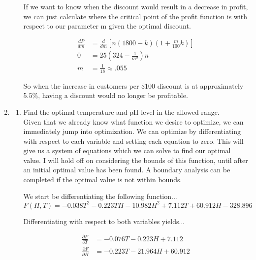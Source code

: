 \documentclass[11pt]{article}
\begin{document}
\begin{enumerate}
\begin{enumerate}
    If we want to know when the discount would result in a decrease in profit, we
    can just calculate where the critical point of the profit function is with
    respect to our parameter m given the optimal discount.
    
    \begin{align*}
        \frac{dP}{dm} &= \frac{d}{dm} \left[n(1800 - k)(1+ \frac{m}{100} k)\right] \\
        0 &= 25\left(324 - \frac{1}{m^2} \right)n \\
        m &= \frac{1}{18} \approx .055
    \end{align*}
    
    So when the increase in customers per \$100 discount is at approximately 5.5\%,
    having a discount would no longer be profitable. \\
    

\end{enumerate} 


\item 
\begin{enumerate}
    \item Find the optimal temperature and pH level in the allowed range. \\

    Given that we already know what function we desire to optimize, we can
    immediately jump into optimization. We can optimize by differentiating with
    respect to each variable and setting each equation to zero. This will give
    us a system of equations which we can solve to find our optimal value. I
    will hold off on considering the bounds of this function, until after an
    initial optimal value has been found. A boundary analysis can be completed
    if the optimal value is not within bounds.

    We start be differentiating the following function...
    \begin{equation}
        F(H,T) = -0.038T^2 - 0.223TH - 10.982H^2 + 7.112T + 60.912H - 328.896
    \end{equation}
    
    Differentiating with respect to both variables yields...

    \begin{align*}
        \frac{\partial F}{\partial T} &= -0.076T - 0.223H + 7.112 \\            
        \frac{\partial F}{\partial H} &= -0.223T - 21.964H + 60.912             
    \end{align*}


\end{enumerate}
\end{enumerate}
\end{document}
